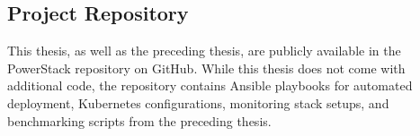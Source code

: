 \subsection{Project Repository}
This thesis, as well as the preceding thesis, are publicly available in the PowerStack\parencite{PowerStack} repository on GitHub. While this thesis does not come with additional code, the repository contains Ansible playbooks for automated deployment, Kubernetes configurations, monitoring stack setups, and benchmarking scripts from the preceding thesis.
